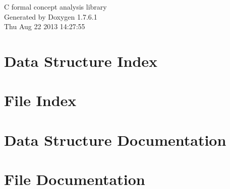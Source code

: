 \documentclass[a4paper]{book}
\begin{document}
\hypersetup{pageanchor=false,citecolor=blue}
\begin{titlepage}
\vspace*{7cm}
\begin{center}
{\Large \-C formal concept analysis library }\\
\vspace*{1cm}
{\large \-Generated by Doxygen 1.7.6.1}\\
\vspace*{0.5cm}
{\small Thu Aug 22 2013 14:27:55}\\
\end{center}
\end{titlepage}
\clearemptydoublepage
{}
\tableofcontents
\clearemptydoublepage
{}
\hypersetup{pageanchor=true,citecolor=blue}
\chapter{\-Data \-Structure \-Index}

\chapter{\-File \-Index}

\chapter{\-Data \-Structure \-Documentation}












\chapter{\-File \-Documentation}




















\printindex
\end{document}

